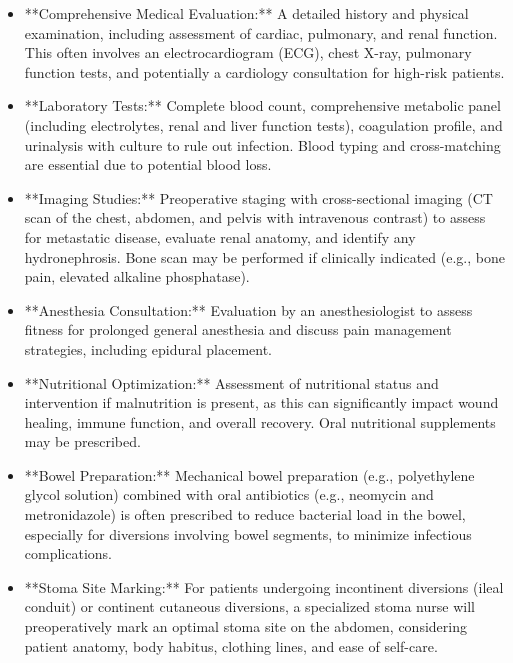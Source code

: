 \begin{itemize}
  \item **Comprehensive Medical Evaluation:** A detailed history and physical examination, including assessment of cardiac, pulmonary, and renal function. This often involves an electrocardiogram (ECG), chest X-ray, pulmonary function tests, and potentially a cardiology consultation for high-risk patients.
  
  \item **Laboratory Tests:** Complete blood count, comprehensive metabolic panel (including electrolytes, renal and liver function tests), coagulation profile, and urinalysis with culture to rule out infection. Blood typing and cross-matching are essential due to potential blood loss.
  
  \item **Imaging Studies:** Preoperative staging with cross-sectional imaging (CT scan of the chest, abdomen, and pelvis with intravenous contrast) to assess for metastatic disease, evaluate renal anatomy, and identify any hydronephrosis. Bone scan may be performed if clinically indicated (e.g., bone pain, elevated alkaline phosphatase).
  
  \item **Anesthesia Consultation:** Evaluation by an anesthesiologist to assess fitness for prolonged general anesthesia and discuss pain management strategies, including epidural placement.
  
  \item **Nutritional Optimization:** Assessment of nutritional status and intervention if malnutrition is present, as this can significantly impact wound healing, immune function, and overall recovery. Oral nutritional supplements may be prescribed.
  
  \item **Bowel Preparation:** Mechanical bowel preparation (e.g., polyethylene glycol solution) combined with oral antibiotics (e.g., neomycin and metronidazole) is often prescribed to reduce bacterial load in the bowel, especially for diversions involving bowel segments, to minimize infectious complications.
  
  \item **Stoma Site Marking:** For patients undergoing incontinent diversions (ileal conduit) or continent cutaneous diversions, a specialized stoma nurse will preoperatively mark an optimal stoma site on the abdomen, considering patient anatomy, body habitus, clothing lines, and ease of self-care.
  

\end{itemize}
